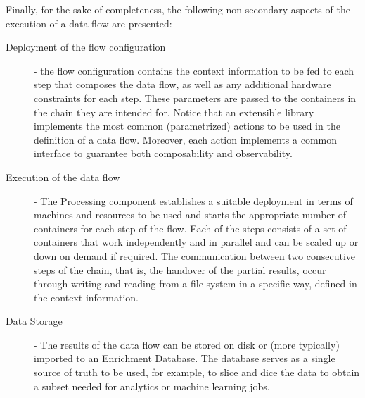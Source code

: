  
Finally, for the sake of completeness, the following non-secondary aspects of the execution of a data flow are presented:
\begin{description}
    \item[Deployment of the flow configuration] - the flow configuration contains the context information to be fed to each step that composes the data flow, as well as any additional hardware constraints for each step. These parameters are passed to the containers in the chain they are intended for. Notice that an extensible library implements the most common (parametrized) actions to be used in the definition of a data flow. Moreover, each action implements a common interface to guarantee both composability and observability. 
    
    \item[Execution of the data flow] - The Processing component establishes a suitable deployment in terms of machines and resources to be used and starts the appropriate number of containers for each step of the flow.  Each of the steps consists of a set of containers that work independently and in parallel and can be scaled up or down on demand if required. The communication between two consecutive steps of the chain, that is, the handover of the partial results, occur through writing and reading from a file system in a specific way, defined in the context information.
    \item[Data Storage] - The results of the data flow can be stored on disk or (more typically) imported to an Enrichment Database. The database serves as a single source of truth to be used, for example, to slice and dice the data to obtain a subset needed for analytics or machine learning jobs. 
\end{description} 
